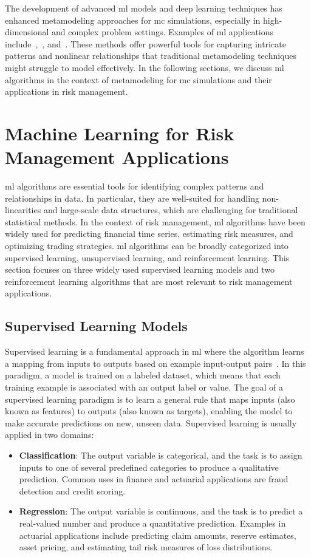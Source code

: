 The development of advanced \gls{ml} models and deep learning techniques has enhanced metamodeling approaches for \gls{mc} simulations, especially in high-dimensional and complex problem settings.
Examples of \gls{ml} applications include~\cite{jin2020deep},~\cite{tang2020deep}, and~\cite{rosen2012metamodeling}.
These methods offer powerful tools for capturing intricate patterns and nonlinear relationships that traditional metamodeling techniques might struggle to model effectively.
In the following sections, we discuss \gls{ml} algorithms in the context of metamodeling for \gls{mc} simulations and their applications in risk management.

\section{Machine Learning for Risk Management Applications}

\gls{ml} algorithms are essential tools for identifying complex patterns and relationships in data.
In particular, they are well-suited for handling non-linearities and large-scale data structures, which are challenging for traditional statistical methods.
In the context of risk management, \gls{ml} algorithms have been widely used for predicting financial time series, estimating risk measures, and optimizing trading strategies.
\gls{ml} algorithms can be broadly categorized into supervised learning, unsupervised learning, and reinforcement learning.
This section focuses on three widely used supervised learning models and two reinforcement learning algorithms that are most relevant to risk management applications.

\subsection{Supervised Learning Models}

Supervised learning is a fundamental approach in \gls{ml} where the algorithm learns a mapping from inputs to outputs based on example input-output pairs~\cite{galton1886regression}.
In this paradigm, a model is trained on a labeled dataset, which means that each training example is associated with an output label or value.
The goal of a supervised learning paradigm is to learn a general rule that maps inputs (also known as features) to outputs (also known as targets), enabling the model to make accurate predictions on new, unseen data.
Supervised learning is usually applied in two domains:
\begin{itemize} 
    \item \textbf{Classification}: The output variable is categorical, and the task is to assign inputs to one of several predefined categories to produce a qualitative prediction.
    Common uses in finance and actuarial applications are fraud detection and credit scoring.
    \item \textbf{Regression}: The output variable is continuous, and the task is to predict a real-valued number and produce a quantitative prediction.
    Examples in actuarial applications include predicting claim amounts, reserve estimates, asset pricing, and estimating tail risk measures of loss distributions.
\end{itemize}

